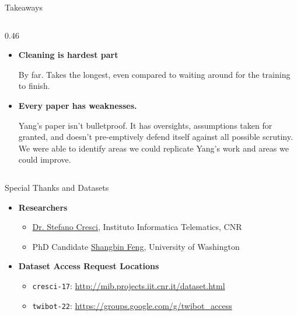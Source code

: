 \documentclass[aspectratio=169, 10pt]{beamer}
\begin{document}
\begin{frame}{Takeaways}
\begin{columns}[T]
    \begin{column}{0.46\textwidth}
      \begin{itemize}
        \item \textbf{Cleaning is hardest part}
          \begin{indentedblock}
            \scriptsize By far. Takes the longest, even compared to waiting around for the training to finish.
          \end{indentedblock}
        \item \textbf{Every paper has weaknesses.}
          \begin{indentedblock}
            \scriptsize Yang's paper isn't bulletproof. It has oversights, assumptions taken for granted, and doesn't pre-emptively defend itself against all possible scrutiny.\\
            We were able to identify areas we could replicate Yang's work and areas we could improve.
          \end{indentedblock}
      \end{itemize}
    \end{column}
  \end{columns}
\end{frame}

\begin{frame}{Special Thanks and Datasets}
  \begin{itemize}
    \item \textbf{Researchers}
      \begin{itemize}
        \item \href{mailto:stefano.cresci@iit.cnr.it}{Dr. Stefano Cresci}, Instituto Informatica Telematics, CNR
        \item PhD Candidate \href{mailto:shangbin@cs.washington.edu}{Shangbin Feng}, University of Washington
      \end{itemize}
    \vspace{0.3cm}
    \item \textbf{Dataset Access Request Locations}
      \begin{itemize}
        \item \texttt{cresci-17}: \url{http://mib.projects.iit.cnr.it/dataset.html}
        \item \texttt{twibot-22}: \url{https://groups.google.com/g/twibot_access}
      \end{itemize}
  \end{itemize}
\end{frame}
\end{document}
